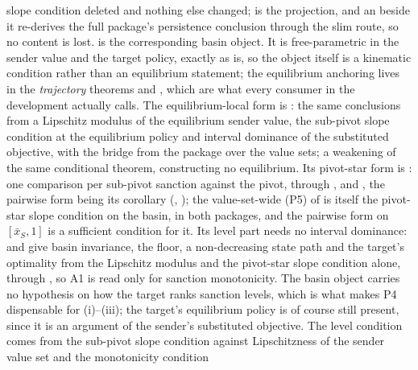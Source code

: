 \begin{itemize}[leftmargin=1.4em,itemsep=1pt]
slope condition deleted and nothing else changed;
 is the
projection, and an  beside it re-derives the full
package's persistence conclusion through the slim route, so no content
is lost.  is the corresponding
basin object. It is free-parametric in the sender value and the target
policy, exactly as  is, so the object
itself is a kinematic condition rather than an equilibrium statement;
the equilibrium anchoring lives in the \emph{trajectory} theorems
 and
, which
are what every consumer in the development actually calls. The equilibrium-local form is : the same conclusions from a Lipschitz modulus of the equilibrium sender value, the sub-pivot slope condition at the equilibrium policy and interval dominance of the substituted objective, with  the bridge from the package over the value sets; a weakening of the same conditional theorem, constructing no equilibrium. Its pivot-star form is : one comparison per sub-pivot sanction against the pivot, through ,  and , the pairwise form being its corollary (, ); the value-set-wide (P5) of  is itself the pivot-star slope condition on the basin, in both packages, and the pairwise form on $[\bar x_S,1]$ is a sufficient condition for it. Its level part needs no interval dominance:  and  give basin invariance, the floor, a non-decreasing state path and the target's optimality from the Lipschitz modulus and the pivot-star slope condition alone, through , so A1 is read only for sanction monotonicity.
The basin object carries no hypothesis on how the target ranks sanction levels, which
is what makes P4 dispensable for (i)--(iii); the target's equilibrium
policy is of course still present, since it is an argument of the
sender's substituted objective. The level condition comes from the sub-pivot
slope condition against Lipschitzness of the sender value set and the monotonicity condition

\end{itemize}
